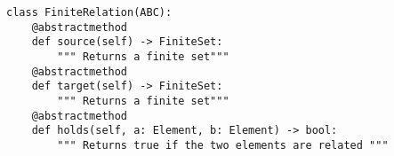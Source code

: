 \par\begin{minipage}{60ex}
\begin{verbatim}
class FiniteRelation(ABC):
    @abstractmethod
    def source(self) -> FiniteSet:
        """ Returns a finite set"""
    @abstractmethod
    def target(self) -> FiniteSet:
        """ Returns a finite set"""
    @abstractmethod
    def holds(self, a: Element, b: Element) -> bool:
        """ Returns true if the two elements are related """
\end{verbatim}
\end{minipage}\par